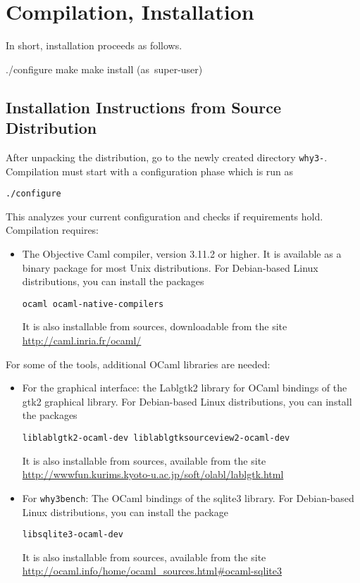 
\chapter{Compilation, Installation}
\label{sec:install}


In short, installation proceeds as follows.
\begin{flushleft}\ttfamily
  ./configure
  make
  make install \mbox{\rmfamily (as super-user)}
\end{flushleft}

\section{Installation Instructions from Source Distribution}

After unpacking the distribution, go to the newly created directory
\texttt{why3-\whyversion}. Compilation must start with a
configuration phase which is run as 
\begin{verbatim}
./configure
\end{verbatim}
This analyzes your current configuration and checks if requirements hold.
Compilation requires:
\begin{itemize}
\item The Objective Caml compiler, version 3.11.2 or higher. It is
  available as a binary package for most Unix distributions. For
  Debian-based Linux distributions, you can install the packages
\begin{verbatim}
ocaml ocaml-native-compilers
\end{verbatim}
It is also installable from sources, downloadable from the site
\url{http://caml.inria.fr/ocaml/}
\end{itemize}

\noindent
For some of the \why tools, additional OCaml libraries are needed:
\begin{itemize}
\item For the graphical interface: the Lablgtk2 library for OCaml
  bindings of the gtk2 graphical library. For Debian-based Linux
  distributions, you can install the packages
\begin{verbatim}
liblablgtk2-ocaml-dev liblablgtksourceview2-ocaml-dev
\end{verbatim}
It is also installable from sources, available from the site
\url{http://wwwfun.kurims.kyoto-u.ac.jp/soft/olabl/lablgtk.html}

\item For \texttt{why3bench}: The OCaml bindings of the sqlite3 library.
For Debian-based Linux distributions, you can install the package
\begin{verbatim}
libsqlite3-ocaml-dev
\end{verbatim}
It is also installable from sources, available from the site
\url{http://ocaml.info/home/ocaml_sources.html#ocaml-sqlite3}
\end{itemize}

